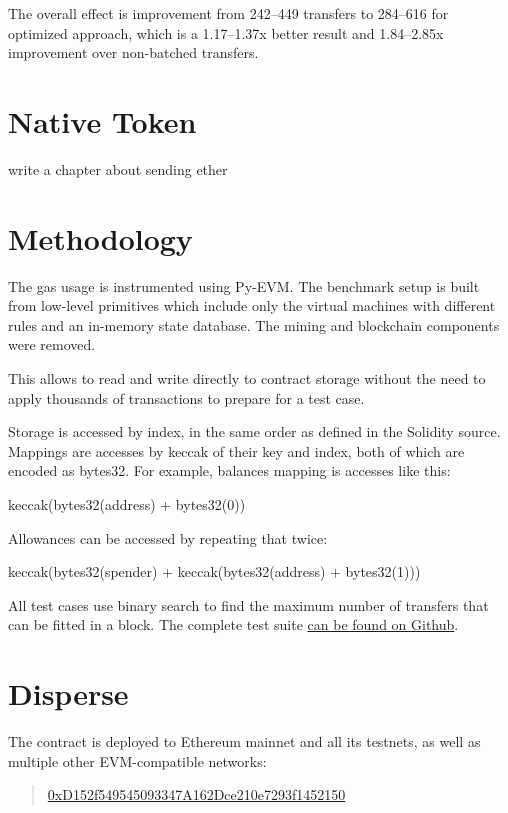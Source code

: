 \documentclass[12pt]{article}
\begin{document}
The overall effect is improvement from 242--449 transfers to 284--616 for optimized approach, which is a 1.17--1.37x better result and 1.84--2.85x improvement over non-batched transfers.


\section{Native Token}

{\color{red} write a chapter about sending ether}

\section{Methodology}

The gas usage is instrumented using Py-EVM\cite{pyevm}.
The benchmark setup is built from low-level primitives which include only the virtual machines with different rules and an in-memory state database. The mining and blockchain components were removed.

This allows to read and write directly to contract storage without the need to apply thousands of transactions to prepare for a test case.

Storage is accessed by index, in the same order as defined in the Solidity source\cite{read-storage}.
Mappings are accesses by keccak of their key and index, both of which are encoded as bytes32.
For example, balances mapping is accesses like this:
\begin{center}
	keccak(bytes32(address) + bytes32(0))	
\end{center}

Allowances can be accessed by repeating that twice:
\begin{center}
keccak(bytes32(spender) + keccak(bytes32(address) + bytes32(1)))	
\end{center}

All test cases use binary search to find the maximum number of transfers that can be fitted in a block.
The complete test suite \href{https://github.com/banteg/disperse-reseach}{can be found on Github}.

\section{Disperse}

The contract is deployed to Ethereum mainnet and all its testnets, as well as multiple other EVM-compatible networks:
\begin{quote}
	\href{https://etherscan.io/address/0xD152f549545093347A162Dce210e7293f1452150}{0xD152f549545093347A162Dce210e7293f1452150}
\end{quote}
\end{document}
